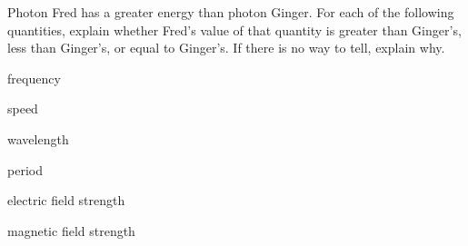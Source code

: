 Photon Fred has a greater energy than photon Ginger. For each of the
following quantities, explain whether
Fred's value of that quantity is greater than Ginger's,
less than Ginger's, or equal to Ginger's. If there is no way to tell,
explain why.

 frequency

 speed

 wavelength

 period

 electric field strength

 magnetic field strength

